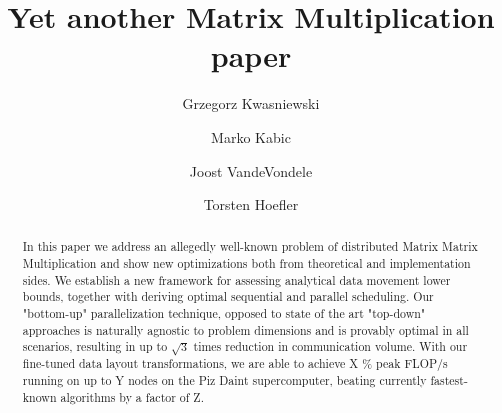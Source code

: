 \documentclass[sigconf]{acmart}
\begin{document}
	\title{Yet another Matrix Multiplication paper}
		
	\author{Grzegorz Kwasniewski}
	
			\author{Marko Kabic}
	
			\author{Joost VandeVondele}
	
		\author{Torsten Hoefler}
	
	\begin{abstract}
In this paper we address an allegedly well-known problem of distributed Matrix 
Matrix Multiplication and show new optimizations both from theoretical and 
implementation sides. We establish a new framework for 
assessing 
analytical data movement lower bounds, together with deriving optimal 
sequential and parallel scheduling. Our "bottom-up" parallelization technique, 
opposed to state of the art "top-down" approaches is naturally agnostic to 
problem dimensions and is provably optimal in all scenarios, resulting in up to 
$\sqrt{3}$ times reduction in communication volume. With our 
fine-tuned data layout 
transformations, we are able to achieve X \% peak FLOP/s running on up to Y 
nodes on the Piz Daint supercomputer, beating currently fastest-known 
algorithms by a factor of Z.
	\end{abstract}



\maketitle
\end{document}
